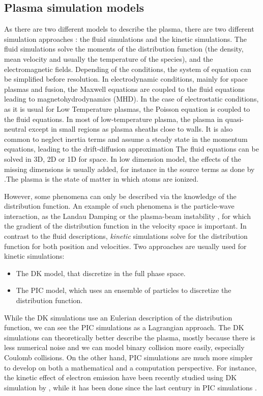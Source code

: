 \subsection*{Plasma simulation models} \label{subsec-simulations}
As there are two different models to describe the plasma, there are two different simulation approaches \string: the fluid simulations and the kinetic simulations.
The fluid simulations solve the moments of the distribution function (the density, mean velocity and usually the temperature of the species), and the electromagnetic fields.
Depending of the conditions, the system of equation can be simplified before resolution.
In electrodynamic conditions, mainly for space plasmas and fusion, the Maxwell equations are coupled to the fluid equations leading to magnetohydrodynamics (MHD).
In the case of electrostatic conditions, as it is usual for Low Temperature plasmas, the Poisson equation is coupled to the fluid equations.
In most of low-temperature plasma, the plasma in quasi-neutral except in small regions as plasma sheaths close to walls.
It is also common to neglect inertia terms and assume a steady state in the momentum equations, leading to the drift-diffusion approximation
The fluid equations can be solved in \ac{3D}, \ac{2D} or \ac{1D} for space.
In low dimension model, the effects of the missing dimensions is usually added, for instance in the source terms as done by \citet{barral2003a}.The plasma is the state of matter in which atoms are ionized.


\vspace{1em}
However, some phenomena can only be described via the knowledge of the distribution function.
An example of such phenomena is the particle-wave interaction, as the Landau Damping \citep{landau1945,malmberg1964} or the plasma-beam instability \citep{filippychev1990}, for which the gradient of the distribution function in the velocity space is important.
In contrast to the fluid descriptions, \emph{kinetic} simulations solve for the distribution function for both position and velocities.
Two approaches are usually used for kinetic simulations\string:
\begin{itemize}
  \item The \ac{DK} model, that discretize  in the full phase space.
  \item The \ac{PIC} model, which uses an ensemble of particles to discretize the distribution function.
\end{itemize} 
While the \ac{DK} simulations use an Eulerian description of the distribution function, we can see the \ac{PIC} simulations as a Lagrangian approach.
The \ac{DK} simulations can theoretically better describe the plasma, mostly because there is less numerical noise and we can model binary collision more easily, especially Coulomb collisions.
On the other hand, \ac{PIC} simulations are much more simpler to develop on both a mathematical and a computation perspective.
For instance, the kinetic effect of electron emission have been recently studied using \ac{DK} simulation by \citet{cagas2019}, while it has been done since the last century in \ac{PIC} simulations \citep{boswell1988}.


